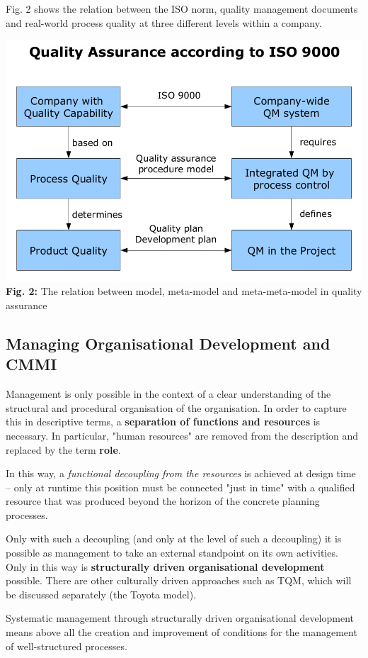 \documentclass[11pt,a4paper]{article}
\begin{document}
Fig. 2 shows the relation between the ISO norm, quality management documents
and real-world process quality at three different levels within a company.  

\begin{center}
  \includegraphics[width=.8\textwidth]{1.png}\\ \textbf{Fig. 2:} The relation
  between model, meta-model and meta-meta-model in quality assurance
\end{center}

\subsection{Managing Organisational Development and CMMI}

Management is only possible in the context of a clear understanding of the
structural and procedural organisation of the organisation.  In order to
capture this in descriptive terms, a \textbf{separation of functions and
  resources} is necessary. In particular, "human resources" are removed from
the description and replaced by the term \textbf{role}.

In this way, a \emph{functional decoupling from the resources} is achieved at
design time -- only at runtime this position must be connected "just in time"
with a qualified resource that was produced beyond the horizon of the concrete
planning processes.

Only with such a decoupling (and only at the level of such a decoupling) it is
possible as management to take an external standpoint on its own activities.
Only in this way is \textbf{structurally driven organisational development}
possible. There are other culturally driven approaches such as TQM, which will
be discussed separately (the Toyota model).

Systematic management through structurally driven organisational development
means above all the creation and improvement of conditions for the management
of well-structured processes.
\end{document}
